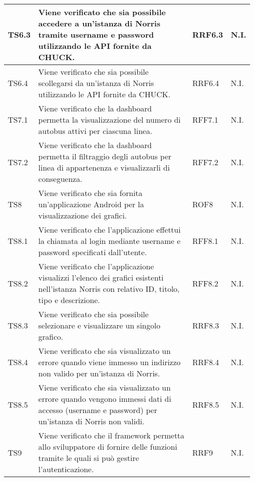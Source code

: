 \begin{longtabu}{| X[0.5] | X | X[0.5] | X[0.4] |}
TS6.3 & Viene verificato che sia possibile accedere a un'istanza di Norris tramite username e password utilizzando le API fornite da CHUCK. & RRF6.3 & N.I.\\ \hline

TS6.4 & Viene verificato che sia possibile scollegarsi da un'istanza di Norris utilizzando le API fornite da CHUCK. & RRF6.4 & N.I.\\ \hline

TS7.1 & Viene verificato che la dashboard permetta la visualizzazione del numero di autobus attivi per ciascuna linea. & RFF7.1 & N.I.\\ \hline

TS7.2 & Viene verificato che la dashboard permetta il filtraggio degli autobus per linea di appartenenza e visualizzarli di conseguenza. & RFF7.2 & N.I.\\ \hline

TS8 & Viene verificato che sia fornita un'applicazione Android per la visualizzazione dei grafici. & ROF8 & N.I.\\ \hline

TS8.1 & Viene verificato che l'applicazione effettui la chiamata al login mediante username e password specificati dall'utente. & RFF8.1 & N.I.\\ \hline

TS8.2 & Viene verificato che l'applicazione visualizzi l'elenco dei grafici esistenti nell'istanza Norris con relativo ID, titolo, tipo e descrizione. & RFF8.2 & N.I.\\ \hline

TS8.3 & Viene verificato che sia possibile selezionare e visualizzare un singolo grafico. & RRF8.3 & N.I.\\ \hline

TS8.4 & Viene verificato che sia visualizzato un errore quando viene immesso un indirizzo non valido per un'istanza di Norris. & RRF8.4 & N.I.\\ \hline

TS8.5 & Viene verificato che sia visualizzato un errore quando vengono immessi dati di accesso (username e password) per un'istanza di Norris non validi. & RRF8.5 & N.I.\\ \hline

TS9 & Viene verificato che il framework permetta allo sviluppatore di fornire delle funzioni tramite le quali si può gestire l'autenticazione. & RRF9 & N.I.\\ \hline

\end{longtabu}